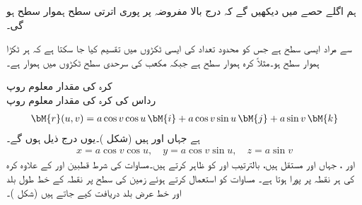 ہم اگلے حصے میں دیکھیں گے کہ درج بالا مفروضہ پر پوری اترتی سطح  ہموار سطح ہو گی۔

 سے مراد ایسی سطح ہے جس کو محدود تعداد کی ایسی ٹکڑوں میں تقسیم کیا جا سکتا ہے کہ ہر ٹکڑا ہموار سطح ہو۔مثلاً کرہ ہموار سطح ہے جبکہ مکعب کی سرحدی سطح ٹکڑوں میں ہموار ہے۔

\quad کرہ کی مقدار معلوم روپ\\
رداس  کی کرہ کی مقدار معلوم روپ
\begin{align}\label{مساوات_خطی_تکمل_خطوط_عرض_بلد_طول_بلد}
\bM{r}(u,v)=a\cos v\cos u \,\bM{i}+a\cos v \sin u \,\bM{j}+a\sin v \,\bM{k}
\end{align}
ہے جہاں  اور  ہیں (شکل )۔یوں درج ذیل ہوں گے۔
\begin{align*}
x=a\cos v\cos u,\quad y=a\cos v\sin u,\quad z=a\sin v
\end{align*}
  اور  ، جہاں  اور  مستقل ہیں، بالترتیب  اور  کو ظاہر کرتے ہیں۔مساوات  کی شرط قطبین  اور  کے علاوہ کرہ کی ہر نقطہ پر پورا ہوتا ہے۔ مساوات  کو استعمال کرتے ہوئے زمین کی سطح پر نقطہ کے   خط طول بلد اور خط عرض بلد دریافت کیے جاتے ہیں (شکل )۔
